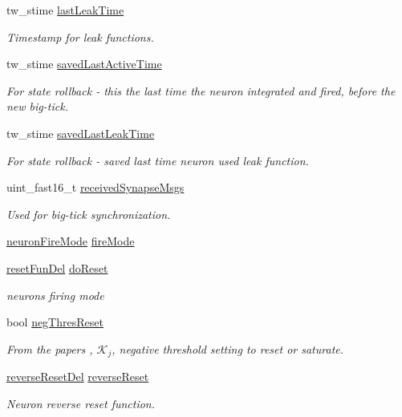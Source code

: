 \begin{DoxyCompactItemize}
tw\+\_\+stime \hyperlink{structneuron_state_a6f4e4d8fc1cf0257b486e01f628d2656}{last\+Leak\+Time}
\begin{DoxyCompactList}\small\item\em Timestamp for leak functions. \end{DoxyCompactList}\item 
tw\+\_\+stime \hyperlink{structneuron_state_a6922b3f3041346eb83cfc6352a22277b}{saved\+Last\+Active\+Time}
\begin{DoxyCompactList}\small\item\em For state rollback -\/ this the last time the neuron integrated and fired, before the new big-\/tick. \end{DoxyCompactList}\item 
tw\+\_\+stime \hyperlink{structneuron_state_a50734a9ba605a083a90814b63d039a03}{saved\+Last\+Leak\+Time}
\begin{DoxyCompactList}\small\item\em For state rollback -\/ saved last time neuron used leak function. \end{DoxyCompactList}\item 
uint\+\_\+fast16\+\_\+t \hyperlink{structneuron_state_af8935bcba177f2f3dfb9119c39ef7dc5}{received\+Synapse\+Msgs}
\begin{DoxyCompactList}\small\item\em Used for big-\/tick synchronization. \end{DoxyCompactList}\end{DoxyCompactItemize}

{\bf }\par
\begin{DoxyCompactItemize}
\item 
\hyperlink{neuron_8h_a48885ea6be5b55a2e24de9f97552d4ee}{neuron\+Fire\+Mode} \hyperlink{structneuron_state_a55890f9e021064df30e9d18a9df98845}{fire\+Mode}
\item 
\hyperlink{neuron_8h_ae7e5990745cd949246894bfb633ca4a2}{reset\+Fun\+Del} \hyperlink{structneuron_state_afcf9d931e4fda519c43b4efeab687463}{do\+Reset}
\begin{DoxyCompactList}\small\item\em neuron\textquotesingle{}s firing mode \end{DoxyCompactList}\item 
bool \hyperlink{structneuron_state_a3ec480684e7a2cfc67a8ef7ac1bf57b9}{neg\+Thres\+Reset}
\begin{DoxyCompactList}\small\item\em From the paper\textquotesingle{}s , $𝒦_j$, negative threshold setting to reset or saturate. \end{DoxyCompactList}\item 
\hyperlink{neuron_8h_aa939c0acc5b3367975f2f0cb7bc36d17}{reverse\+Reset\+Del} \hyperlink{structneuron_state_abf6970098695585c81e101b2a741b9a5}{reverse\+Reset}
\begin{DoxyCompactList}\small\item\em Neuron reverse reset function. \end{DoxyCompactList}\end{DoxyCompactItemize}



